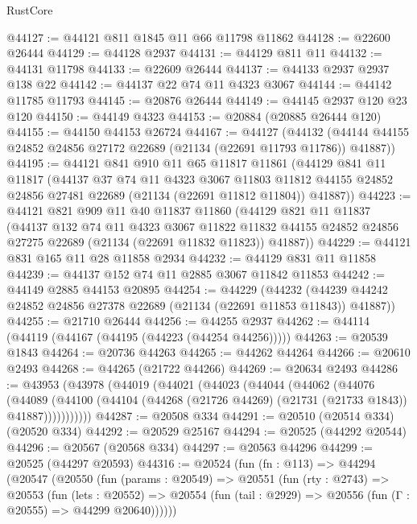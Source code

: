 \begin{lexlean}{RustCore}
\begin{coremodule}
@44127 := @44121 @811 @1845 @11 @66 @11798 @11862
@44128 := @22600 @26444
@44129 := @44128 @2937
@44131 := @44129 @811 @11
@44132 := @44131 @11798
@44133 := @22609 @26444
@44137 := @44133 @2937 @2937 @138 @22
@44142 := @44137 @22 @74 @11 @4323 @3067
@44144 := @44142 @11785 @11793
@44145 := @20876 @26444
@44149 := @44145 @2937 @120 @23 @120
@44150 := @44149 @4323
@44153 := @20884 (@20885 @26444 @120)
@44155 := @44150 @44153 @26724
@44167 := @44127
    (@44132 (@44144 @44155 @24852 @24856 @27172 @22689 (@21134 (@22691 @11793 @11786)) @41887))
@44195 := @44121
    @841
    @910
    @11
    @65
    @11817
    @11861
    (@44129
      @841
      @11
      @11817
      (@44137
        @37
        @74
        @11
        @4323
        @3067
        @11803
        @11812
        @44155
        @24852
        @24856
        @27481
        @22689
        (@21134 (@22691 @11812 @11804))
        @41887))
@44223 := @44121
    @821
    @909
    @11
    @40
    @11837
    @11860
    (@44129
      @821
      @11
      @11837
      (@44137
        @132
        @74
        @11
        @4323
        @3067
        @11822
        @11832
        @44155
        @24852
        @24856
        @27275
        @22689
        (@21134 (@22691 @11832 @11823))
        @41887))
@44229 := @44121 @831 @165 @11 @28 @11858 @2934
@44232 := @44129 @831 @11 @11858
@44239 := @44137 @152 @74 @11 @2885 @3067 @11842 @11853
@44242 := @44149 @2885 @44153 @20895
@44254 := @44229
    (@44232 (@44239 @44242 @24852 @24856 @27378 @22689 (@21134 (@22691 @11853 @11843)) @41887))
@44255 := @21710 @26444
@44256 := @44255 @2937
@44262 := @44114 (@44119 (@44167 (@44195 (@44223 (@44254 @44256)))))
@44263 := @20539 @1843
@44264 := @20736 @44263
@44265 := @44262 @44264
@44266 := @20610 @2493
@44268 := @44265 (@21722 @44266)
@44269 := @20634 @2493
@44286 := @43953
    (@43978
      (@44019
        (@44021
          (@44023
            (@44044
              (@44062
                (@44076
                  (@44089
                    (@44100
                      (@44104 (@44268 (@21726 @44269) (@21731 (@21733 @1843)) @41887)))))))))))
@44287 := @20508 @334
@44291 := @20510 (@20514 @334) (@20520 @334)
@44292 := @20529 @25167
@44294 := @20525 (@44292 @20544)
@44296 := @20567 (@20568 @334)
@44297 := @20563 @44296
@44299 := @20525 (@44297 @20593)
@44316 := @20524
    (fun (fn : @113) =>
    @44294
      (@20547
        (@20550
          (fun (params : @20549) =>
          @20551
            (fun (rty : @2743) =>
            @20553
              (fun (lets : @20552) =>
              @20554 (fun (tail : @2929) => @20556 (fun (Γ : @20555) => @44299 @20640))))))

\end{coremodule}
\end{lexlean}
